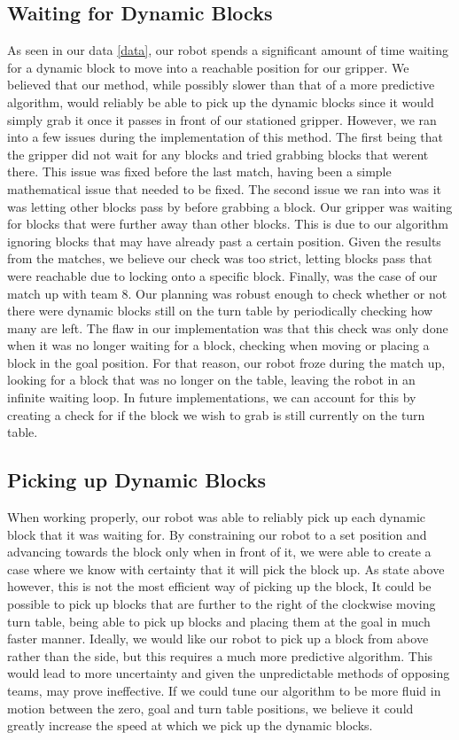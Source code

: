 \documentclass{article}
\begin{document}
     \subsection{Waiting for Dynamic Blocks}
        As seen in our data \ref{data}, our robot spends a significant amount of time waiting for a dynamic block to move into a reachable position for our gripper.  We believed that our method, while possibly slower than that of a more predictive algorithm, would reliably be able to pick up the dynamic blocks since it would simply grab it once it passes in front of our stationed gripper.  However, we ran into a few issues during the implementation of this method.  The first being that the gripper did not wait for any blocks and tried grabbing blocks that werent there.  This issue was fixed before the last match, having been a simple mathematical issue that needed to be fixed.  The second issue we ran into was it was letting other blocks pass by before grabbing a block.  Our gripper was waiting for blocks that were further away than other blocks.  This is due to our algorithm ignoring blocks that may have already past a certain position.  Given the results from the matches, we believe our check was too strict, letting blocks pass that were reachable due to locking onto a specific block.  Finally, was the case of our match up with team 8.  Our planning was robust enough to check whether or not there were dynamic blocks still on the turn table by periodically checking how many are left.  The flaw in our implementation was that this check was only done when it was no longer waiting for a block, checking when moving or placing a block in the goal position.  For that reason, our robot froze during the match up, looking for a block that was no longer on the table, leaving the robot in an infinite waiting loop.  In future implementations, we can account for this by creating a check for if the block we wish to grab is still currently on the turn table.  
     
     \subsection{Picking up Dynamic Blocks}
        When working properly, our robot was able to reliably pick up each dynamic block that it was waiting for.  By constraining our robot to a set position and advancing towards the block only when in front of it, we were able to create a case where we know with certainty that it will pick the block up.  As state above however, this is not the most efficient way of picking up the block,  It could be possible to pick up blocks that are further to the right of the clockwise moving turn table, being able to pick up blocks and placing them at the goal in much faster manner.  Ideally, we would like our robot to pick up a block from above rather than the side, but this requires a much more predictive algorithm.  This would lead to more uncertainty and given the unpredictable methods of opposing teams, may prove ineffective.  If we could tune our algorithm to be more fluid in motion between the zero, goal and turn table positions, we believe it could greatly increase the speed at which we pick up the dynamic blocks.
\end{document}
